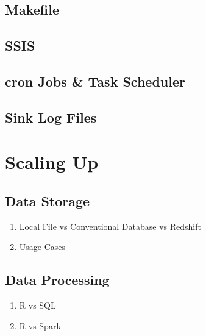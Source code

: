 \documentclass[]{book}
\providecommand{\tightlist}{%
  \setlength{\itemsep}{0pt}\setlength{\parskip}{0pt}}
\begin{document}
\hypertarget{makefile}{%
\section{Makefile}\label{makefile}}

\hypertarget{ssis}{%
\section{SSIS}\label{ssis}}

\hypertarget{cron-jobs-task-scheduler}{%
\section{cron Jobs \& Task Scheduler}\label{cron-jobs-task-scheduler}}

\hypertarget{sink-log-files}{%
\section{Sink Log Files}\label{sink-log-files}}

\hypertarget{scaling-up}{%
\chapter{Scaling Up}\label{scaling-up}}

\hypertarget{data-storage}{%
\section{Data Storage}\label{data-storage}}

\begin{enumerate}
\def\labelenumi{\arabic{enumi}.}
\tightlist
\item
  Local File vs Conventional Database vs Redshift
\item
  Usage Cases
\end{enumerate}

\hypertarget{data-processing}{%
\section{Data Processing}\label{data-processing}}

\begin{enumerate}
\def\labelenumi{\arabic{enumi}.}
\tightlist
\item
  R vs SQL
\item
  R vs Spark
\end{enumerate}
\end{document}
